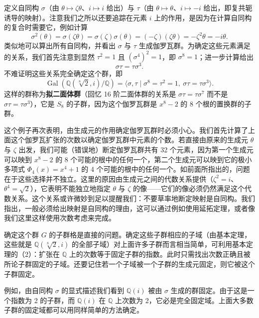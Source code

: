 定义自同构 \(\sigma\)（由 \(\theta \mapsto \zeta\theta\)、\(i \mapsto i\) 给出）与 \(\tau\)（由 \(\theta \mapsto \theta\)、\(i \mapsto -i\) 给出，即复共轭诱导的映射）。注意我们之所以还要追踪在元素 \(i\) 上的作用，是因为在计算自同构的复合时需要它，例如计算
\[
\sigma^2(\theta) = \sigma(\zeta\theta) = \sigma(\zeta)\sigma(\theta) = (-\zeta)(\zeta\theta) = -\zeta^2\theta = -i\theta.
\]
类似地可以算出所有自同构，并看出 \(\sigma\) 与 \(\tau\) 生成伽罗瓦群。为确定这些元素满足的关系，我们首先注意到显然 \(\tau^2 = 1\) 且 \((\sigma^4)^2 = 1\)，即 \(\sigma^8 = 1\)；进一步计算给出
\[
\sigma\tau = \tau\sigma^3.
\]
不难证明这些关系完全确定这个群，即
\[
\operatorname{Gal}(\mathbb{Q}(\sqrt[8]{2}, i)/\mathbb{Q}) = \langle \sigma, \tau \mid \sigma^8 = \tau^2 = 1,\ \sigma\tau = \tau\sigma^3 \rangle.
\]
这样的群称为\textbf{拟二面体群}（回忆 16 阶二面体群的关系是 \(\sigma\tau = \tau\sigma^7\) 而不是 \(\sigma\tau = \tau\sigma^3\)），它是 \(S_8\) 的子群，因为这个伽罗瓦群是 \(x^8-2\) 的 8 个根的置换群的子群。

这个例子再次表明，由生成元的作用确定伽罗瓦群时必须小心。我们首先计算了上面这个伽罗瓦扩张的次数以确定伽罗瓦群中元素的个数。若直接由原来的生成元 \(\theta\) 与 \(\zeta\) 出发，我们可能（错误地）断定伽罗瓦群共有 32 个元素，因为第一个生成元可以映到 \(x^8-2\) 的 8 个可能的根中的任何一个，第二个生成元可以映到它的极小多项式 \(\Phi_4(x) = x^4+1\) 的 4 个可能的根中的任何一个。如前面所指出的，问题在于这些选择并不独立。这里的原因由生成元之间的代数关系提供（\(\zeta^2 = i\)、\(\theta^4 = \sqrt{2}\)），它表明不能独立地指定 \(\theta\) 与 \(\zeta\) 的像——它们的像必须仍然满足这个代数关系。这个关系或许微妙到足以提醒我们：不要草率地断定映射是自同构。我们指出，一般必须给出映射是自同构的理由，这可以通过例如使用延拓定理，或者像我们这里这样使用次数考虑来完成。

确定这个群 \(G\) 的子群格是直接的问题。确定这些子群相应的子域（由基本定理，这些就是 \(\mathbb{Q}(\sqrt[8]{2}, i)\) 的全部子域）对上面许多子群而言相当简单，可利用基本定理的（2）：扩张在 \(\mathbb{Q}\) 上的次数等于固定子群的指数。此时只需找出次数正确且被所论子群固定的子域。还要记住若一个子域被一个子群的生成元固定，则它被这个子群固定。

例如，由自同构 \(\sigma\) 的显式描述我们看到 \(\mathbb{Q}(i)\) 被由 \(\sigma\) 生成的群固定。由于这是一个指数为 2 的子群，而 \(\mathbb{Q}(i)\) 在 \(\mathbb{Q}\) 上次数为 2，它必是完全固定域。上面大多数子群的固定域都可以用同样简单的方法确定。

